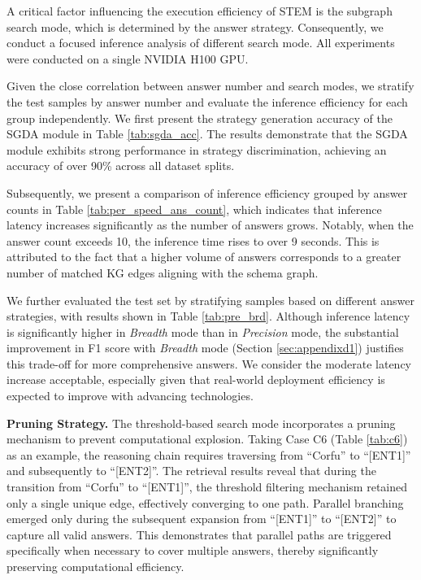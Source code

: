 \documentclass[11pt]{article}
\begin{document}
A critical factor influencing the execution efficiency of STEM is the subgraph search mode, which is determined by the answer strategy. Consequently, we conduct a focused inference analysis of different search mode. All experiments were conducted on a single NVIDIA H100 GPU. 

Given the close correlation between answer number and search modes, we stratify the test samples by answer number and evaluate the inference efficiency for each group independently. We first present the strategy generation accuracy of the SGDA module in Table \ref{tab:sgda_acc}. The results demonstrate that the SGDA module exhibits strong performance in strategy discrimination, achieving an accuracy of over 90\% across all dataset splits.

Subsequently, we present a comparison of inference efficiency grouped by answer counts in Table \ref{tab:per_speed_ans_count}, which indicates that inference latency increases significantly as the number of answers grows. Notably, when the answer count exceeds 10, the inference time rises to over 9 seconds. This is attributed to the fact that a higher volume of answers corresponds to a greater number of matched KG edges aligning with the schema graph.

We further evaluated the test set by stratifying samples based on different answer strategies, with results shown in Table \ref{tab:pre_brd}. Although inference latency is significantly higher in \textit{Breadth} mode than in \textit{Precision} mode, the substantial improvement in F1 score with \textit{Breadth} mode (Section \ref{sec:appendixd1}) justifies this trade-off for more comprehensive answers. We consider the moderate latency increase acceptable, especially given that real-world deployment efficiency is expected to improve with advancing technologies.

\textbf{Pruning Strategy.} The threshold-based search mode incorporates a pruning mechanism to prevent computational explosion. Taking Case C6 (Table \ref{tab:c6}) as an example, the reasoning chain requires traversing from ``Corfu'' to ``[ENT1]'' and subsequently to ``[ENT2]''. The retrieval results reveal that during the transition from ``Corfu'' to ``[ENT1]'', the threshold filtering mechanism retained only a single unique edge, effectively converging to one path. Parallel branching emerged only during the subsequent expansion from ``[ENT1]'' to ``[ENT2]'' to capture all valid answers. This demonstrates that parallel paths are triggered specifically when necessary to cover multiple answers, thereby significantly preserving computational efficiency.
\end{document}
